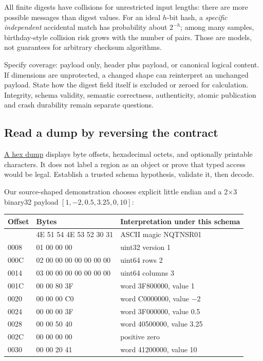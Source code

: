 All finite digests have collisions for unrestricted input lengths: there are more possible messages than digest values. For an ideal \(h\)-bit hash, a \emph{specific independent} accidental match has probability about \(2^{-h}\); among many samples, birthday-style collision risk grows with the number of pairs. Those are models, not guarantees for arbitrary checksum algorithms.

Specify coverage: payload only, header plus payload, or canonical logical content. If dimensions are unprotected, a changed shape can reinterpret an unchanged payload. State how the digest field itself is excluded or zeroed for calculation. Integrity, schema validity, semantic correctness, authenticity, atomic publication and crash durability remain separate questions.

\subsection{Read a dump by reversing the contract}\label{01-foundations-i-ch002-read-a-dump-by-reversing-the-contract}

\hypertarget{01-foundations-i-ch002-read-a-dump-by-reversing-the-contract}{}

\hyperref[appendix-230b59c0676b]{A hex dump} displays byte offsets, hexadecimal octets, and optionally printable characters. It does not label a region as an object or prove that typed access would be legal. Establish a trusted schema hypothesis, validate it, then decode.

Our source-shaped demonstration chooses explicit little endian and a 2×3 binary32 payload \([1,-2,0.5,3.25,0,10]\):

{\def\LTcaptype{none} %
\begin{longtable}[]{@{}lll@{}}
\toprule\noalign{}
Offset & Bytes & Interpretation under this schema \\
\midrule\noalign{}
\endhead
\bottomrule\noalign{}
\endlastfoot
0000 & 4E 51 54 4E 53 52 30 31 & ASCII magic NQTNSR01 \\
0008 & 01 00 00 00 & uint32 version 1 \\
000C & 02 00 00 00 00 00 00 00 & uint64 rows 2 \\
0014 & 03 00 00 00 00 00 00 00 & uint64 columns 3 \\
001C & 00 00 80 3F & word 3F800000, value 1 \\
0020 & 00 00 00 C0 & word C0000000, value −2 \\
0024 & 00 00 00 3F & word 3F000000, value 0.5 \\
0028 & 00 00 50 40 & word 40500000, value 3.25 \\
002C & 00 00 00 00 & positive zero \\
0030 & 00 00 20 41 & word 41200000, value 10 \\
\end{longtable}
}

